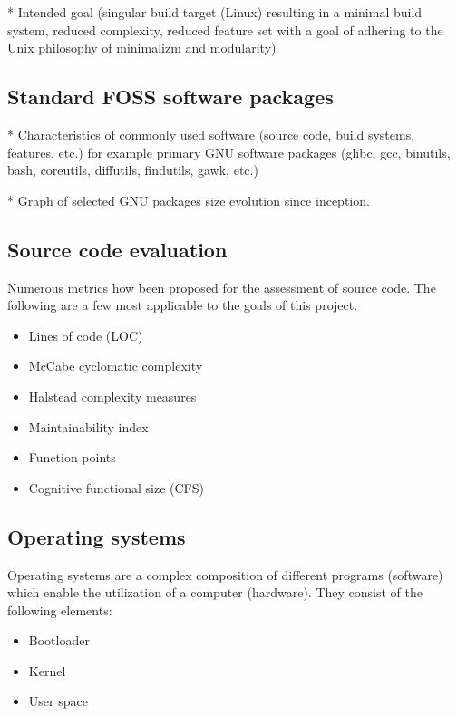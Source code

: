* Intended goal (singular build target (Linux) resulting in a minimal build system, reduced complexity, reduced feature set with a goal of adhering to the Unix philosophy of minimalizm and modularity)

\subsection{Standard FOSS software packages}

* Characteristics of commonly used software (source code, build systems, features, etc.) for example primary GNU software packages (glibc, gcc, binutils, bash, coreutils, diffutils, findutils, gawk, etc.)

* Graph of selected GNU packages size evolution since inception.

\subsection{Source code evaluation}

Numerous metrics how been proposed for the assessment of source code.
The following are a few most applicable to the goals of this project.

\begin{itemize}
    \item Lines of code (LOC)
    \item McCabe cyclomatic complexity
    \item Halstead complexity measures
    \item Maintainability index
    \item Function points
    \item Cognitive functional size (CFS)
\end{itemize}

\subsection{Operating systems}

Operating systems are a complex composition of different programs (software) which enable the utilization of a computer (hardware). They consist of the following elements:

\begin{itemize}
    \item Bootloader
    \item Kernel
    \item User space
\end{itemize}

